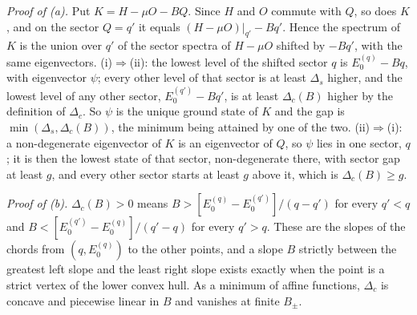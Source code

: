\documentclass[aps,prx,onecolumn,10pt,nofootinbib,longbibliography,floatfix]{revtex4-2}
\theoremstyle{remark}
\begin{document}
\emph{Proof of (a).} Put $K=H-\mu O-BQ$. Since $H$ and $O$ commute with $Q$, so does $K$, and on the sector $Q=q'$
it equals $(H-\mu O)|_{q'}-Bq'$. Hence the spectrum of $K$ is the union over $q'$ of the sector spectra of $H-\mu O$
shifted by $-Bq'$, with the same eigenvectors. (i)$\Rightarrow$(ii): the lowest level of the shifted sector $q$ is
$E_0^{(q)}-Bq$, with eigenvector $\psi$; every other level of that sector is at least $\Delta_s$ higher, and the
lowest level of any other sector, $E_0^{(q')}-Bq'$, is at least $\Delta_c(B)$ higher by the definition of
$\Delta_c$. So $\psi$ is the unique ground state of $K$ and the gap is $\min(\Delta_s,\Delta_c(B))$, the minimum
being attained by one of the two. (ii)$\Rightarrow$(i): a non-degenerate eigenvector of $K$ is an eigenvector of
$Q$, so $\psi$ lies in one sector, $q$; it is then the lowest state of that sector, non-degenerate there, with
sector gap at least $g$, and every other sector starts at least $g$ above it, which is $\Delta_c(B)\ge g$.

\emph{Proof of (b).} $\Delta_c(B)>0$ means $B>[E_0^{(q)}-E_0^{(q')}]/(q-q')$ for every $q'<q$ and
$B<[E_0^{(q')}-E_0^{(q)}]/(q'-q)$ for every $q'>q$. These are the slopes of the chords from $(q,E_0^{(q)})$ to the
other points, and a slope $B$ strictly between the greatest left slope and the least right slope exists exactly
when the point is a strict vertex of the lower convex hull. As a minimum of affine functions, $\Delta_c$ is concave
and piecewise linear in $B$ and vanishes at finite $B_\pm$.
\end{document}

